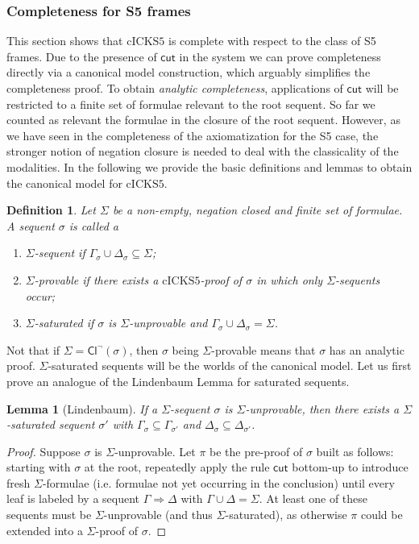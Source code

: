 \documentclass{myifcolog}
\newcommand\Cl {\mathsf{Cl}}
\newcommand{\cickss}{\mathrm{cICKS5}}
\newtheorem{definition}[theorem]{Definition}
\newtheorem{lemma}[theorem]{Lemma}
\numberwithin{theorem}{section}
\begin{document}
\subsubsection{Completeness for S5 frames}\label{ss: completeness for s5 frames}

 This section shows that $\cickss$ is complete with respect to the class of S5 frames. Due to the presence of $\mathsf{cut}$ in the system we can prove completeness directly via a canonical model construction, which arguably simplifies the completeness proof. To obtain \emph{analytic completeness}, applications of $\mathsf{cut}$ will be restricted to a finite set of formulae relevant to the root sequent. So far we counted as relevant the formulae in the closure of the root sequent. However, as we have seen in the completeness of the axiomatization for the S5 case, the stronger notion of negation closure is needed to deal with the classicality of the modalities. In the following we provide the basic definitions and lemmas to obtain the canonical model for $\cickss$.

\begin{definition}
Let $\Sigma$ be a non-empty, negation closed and finite set of formulae. A sequent $\sigma$ is called a
\begin{enumerate}
    \item \emph{$\Sigma$-sequent} if $\Gamma_\sigma \cup \Delta_\sigma \subseteq \Sigma$;
    \item \emph{$\Sigma$-provable} if there exists a $\cickss$-proof of $\sigma$ in which only $\Sigma$-sequents occur;
    \item \emph{$\Sigma$-saturated} if $\sigma$ is $\Sigma$-unprovable and $\Gamma_\sigma \cup \Delta_\sigma = \Sigma$.
\end{enumerate} 
\end{definition}

Not that if $\Sigma=\Cl^{\neg}(\sigma)$, then $\sigma$ being $\Sigma$-provable means that $\sigma$ has an analytic proof. $\Sigma$-saturated sequents will be the worlds of the canonical model. Let us first prove an analogue of the Lindenbaum Lemma for saturated sequents.

\begin{lemma}[Lindenbaum]\label{l: Lindenbaum for saturated sequents}
    If a $\Sigma$-sequent $\sigma$ is $\Sigma$-unprovable, then there exists a $\Sigma$-saturated sequent $\sigma'$ with $\Gamma_\sigma \subseteq \Gamma_{\sigma'}$ and $\Delta_\sigma \subseteq \Delta_{\sigma'}$.
\end{lemma}
\begin{proof}
    Suppose $\sigma$ is $\Sigma$-unprovable. Let $\pi$ be the pre-proof of $\sigma$ built as follows: starting with $\sigma$ at the root, repeatedly apply the rule $\mathsf{cut}$ bottom-up to introduce fresh $\Sigma$-formulae (i.e. formulae not yet occurring in the conclusion) until every leaf is labeled by a sequent $\Gamma \Rightarrow \Delta$ with $\Gamma \cup \Delta = \Sigma$. At least one of these sequents must be $\Sigma$-unprovable (and thus $\Sigma$-saturated), as otherwise $\pi$ could be extended into a $\Sigma$-proof of $\sigma$.
\end{proof}
\end{document}
